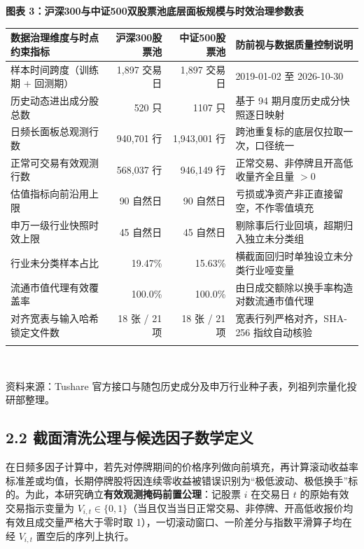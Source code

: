 \documentclass[12pt,a4paper]{article}
\let\origsubsection\subsection
\renewcommand{\subsection}[1]{\needspace{4\baselineskip}\origsubsection{#1}}
\newcommand{\exhibitcap}[1]{{\sffamily\bfseries\fontsize{9.6pt}{12.5pt}\selectfont\textcolor{Primary}{#1}}\\[2pt]}
\newcommand{\exhibitnote}[1]{{\fontsize{7.5pt}{10pt}\selectfont\color{GrayNote}#1\par}}
\begin{document}
\vspace{4pt}
\noindent\begin{minipage}{\textwidth}
\setlength{\parindent}{0pt}\setlength{\tabcolsep}{4.5pt}
\exhibitcap{图表 3：沪深300与中证500双股票池底层面板规模与时效治理参数表}
\fontsize{8.0pt}{11pt}\selectfont
\begin{tabularx}{\textwidth}{@{}X r r l@{}}
  \arrayrulecolor{Primary}\toprule[1.0pt]
  \rowcolor{TblHdr}
  \textbf{\sffamily 数据治理维度与时点约束指标} & \textbf{\sffamily 沪深300股票池} & \textbf{\sffamily 中证500股票池} & \textbf{\sffamily 防前视与数据质量控制说明} \\
  \midrule[0.5pt]
  样本时间跨度（训练期 + 回测期） & 1,897 交易日 & 1,897 交易日 & 2019-01-02 至 2026-10-30 \\
  历史动态进出成分股总数 & 520 只 & 1107 只 & 基于 94 期月度历史成分快照逐日映射 \\
  日频长面板总观测行数 & 940,701 行 & 1,943,001 行 & 跨池重复标的底层仅拉取一次，口径统一 \\
  正常可交易有效观测行数 & 568,037 行 & 946,149 行 & 正常交易、非停牌且开高低收量齐全且量 $>0$ \\
  估值指标向前沿用上限 & 90 自然日 & 90 自然日 & 亏损或净资产非正直接留空，不作零值填充 \\
  申万一级行业快照时效上限 & 45 自然日 & 45 自然日 & 剔除事后行业回填，超期归入独立未分类组 \\
  行业未分类样本占比 & 19.47\% & 15.63\% & 横截面回归时单独设立未分类行业哑变量 \\
  流通市值代理有效覆盖率 & 100.0\% & 100.0\% & 由日成交额除以换手率构造对数流通市值代理 \\
  对齐宽表与输入哈希锁定文件数 & 18 张 / 21 项 & 18 张 / 21 项 & 宽表行列严格对齐，SHA-256 指纹自动核验 \\
  \arrayrulecolor{Primary}\bottomrule[1.0pt]
\end{tabularx}\\[3pt]
\exhibitnote{资料来源：Tushare 官方接口与随包历史成分及申万行业种子表，列祖列宗量化投研部整理。}
\end{minipage}
\vspace{5pt}

\subsection{2.2 截面清洗公理与候选因子数学定义}

在日频多因子计算中，若先对停牌期间的价格序列做向前填充，再计算滚动收益率标准差或均值，长期停牌股将因连续零收益被错误识别为“极低波动、极低换手”标的。为此，本研究确立\textbf{有效观测掩码前置公理}：记股票 $i$ 在交易日 $t$ 的原始有效交易指示变量为 $V_{i,t} \in \{0, 1\}$（当且仅当当日正常交易、非停牌、开高低收报价均有效且成交量严格大于零时取 1），一切滚动窗口、一阶差分与指数平滑算子均在经 $V_{i,t}$ 置空后的序列上执行。
\end{document}

